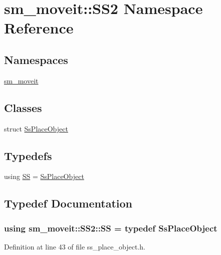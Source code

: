 \hypertarget{namespacesm__moveit_1_1SS2}{}\section{sm\+\_\+moveit\+:\+:S\+S2 Namespace Reference}
\label{namespacesm__moveit_1_1SS2}
\subsection*{Namespaces}
\begin{DoxyCompactItemize}
\item 
 \hyperlink{namespacesm__moveit_1_1SS2_1_1sm__moveit}{sm\+\_\+moveit}
\end{DoxyCompactItemize}
\subsection*{Classes}
\begin{DoxyCompactItemize}
\item 
struct \hyperlink{structsm__moveit_1_1SS2_1_1SsPlaceObject}{Ss\+Place\+Object}
\end{DoxyCompactItemize}
\subsection*{Typedefs}
\begin{DoxyCompactItemize}
\item 
using \hyperlink{namespacesm__moveit_1_1SS2_af2aad268be87b0f3360fd87ba135d957}{SS} = \hyperlink{structsm__moveit_1_1SS2_1_1SsPlaceObject}{Ss\+Place\+Object}
\end{DoxyCompactItemize}


\subsection{Typedef Documentation}
\subsubsection[{\texorpdfstring{SS}{SS}}]{\setlength{\rightskip}{0pt plus 5cm}using {\bf sm\+\_\+moveit\+::\+S\+S2\+::\+SS} = typedef {\bf Ss\+Place\+Object}}\hypertarget{namespacesm__moveit_1_1SS2_af2aad268be87b0f3360fd87ba135d957}{}\label{namespacesm__moveit_1_1SS2_af2aad268be87b0f3360fd87ba135d957}


Definition at line 43 of file ss\+\_\+place\+\_\+object.\+h.

